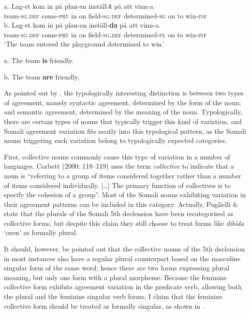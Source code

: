 \documentclass[output=paper]{langsci/langscibook}
\begin{document}
\ea
\ea
\gll a.  Lag-et           kom          in på plan-en        inställ-\textbf{t}            på att vinn-a.\\
       team-\textsc{sg.def} come-\textsc{prt} in on field-\textsc{sg.def} determined-\textsc{sg} on to  win-\textsc{inf}\\

\ex
\gll b.  Lag-et           kom          in på plan-en        inställ-\textbf{da}        på att vinn-a.\\
       team-\textsc{sg.def}  come-\textsc{prt} in on field-\textsc{sg.def} determined-\textsc{pl} on to  win-\textsc{inf} \\
\glt ‘The team entered the playground determined to win.’
\z
\z

\ea a.  The team \textbf{is} friendly.
\z

\ea
 b.  The team \textbf{are} friendly.
\z

As pointed out by \citet[187]{Corbett2000}, the typologically interesting distinction is between two types of agreement, namely syntactic agreement, determined by the form of the noun; and semantic agreement, determined by the meaning of the noun. Typologically, there are certain types of nouns that typically trigger this kind of variation, and Somali agreement variation fits neatly into this typological pattern, as the Somali nouns triggering such variation belong to typologically expected categories.

First, collective nouns commonly cause this type of variation in a number of languages. Corbett (2000: 118–119) uses the term \textit{collective} to indicate that a noun is “referring to a group of items considered together rather than a number of items considered individually. […] The primary function of collectives is to specify the cohesion of a group”. Most of the Somali nouns exhibiting variation in their agreement patterns can be included in this category. Actually, Puglielli \& \citet[82]{Siyaad1984} state that the plurals of the Somali 5th declension have been recategorised as collective forms, but despite this claim they still choose to treat forms like \textit{dibída} ‘oxen’ as formally plural.

It should, however, be pointed out that the collective nouns of the 5th declension in most instances also have a regular plural counterpart based on the masculine singular form of the same word; hence there are two forms expressing plural meaning, but only one form with a plural morpheme. Because the feminine collective form exhibits agreement variation in the predicate verb, allowing both the plural and the feminine singular verb forms, I claim that the feminine collective form should be treated as formally singular, as shown in .
 
\end{document}
